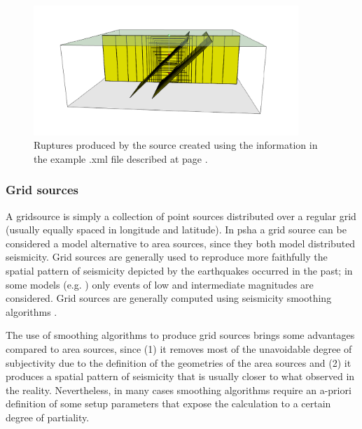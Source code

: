 \begin{figure}[!ht]
\centering
\includegraphics[width=10cm]{./figures/hazard/pointsrc_2strike_2hypodep.pdf}
\caption{Ruptures produced by the source created using the information 
    in the example .xml file described at page \pageref{page:xml_point}.}
\label{fig:point_source_ruptures}
\end{figure}
%
\subsubsection{Grid sources}
\label{hazard:seismic_source_types:gridSources}
% 
A \gls{gridsource} is simply a collection of
point sources distributed over a regular grid (usually equally spaced in 
longitude and latitude).
%
In \gls{psha} a grid source can be considered a model alternative to area 
sources, since they both model distributed seismicity. 
%
Grid sources are generally used to reproduce more faithfully 
the spatial pattern of seismicity depicted by the earthquakes 
occurred in the past; in some models (e.g. \citet{petersen2008})
only events of low and intermediate magnitudes are considered. 
%
Grid sources are generally computed using seismicity smoothing algorithms 
\citep[][amongst many others]{frankel1995,woo1996}. 

The use of smoothing algorithms to produce grid sources brings some 
advantages compared to area sources, since (1) it removes most of the 
unavoidable degree of subjectivity due to 
the definition of the geometries of the area sources and (2) it produces
a spatial pattern of seismicity that is usually closer to what observed in 
the reality. 
Nevertheless, in many cases smoothing algorithms require an a-priori 
definition of some setup parameters that expose the calculation to a 
certain degree of partiality.


